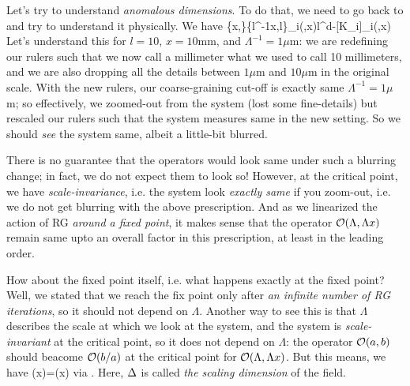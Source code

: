 Let's try to understand \emph{anomalous dimensions}. To do that, we need to go back to  and try to understand it physically. We have
\be 
\{x,\Lambda\}\rightarrow\{l^{-1}x,l\Lambda\}\quad\Rightarrow\quad\cO_i(\Lambda,\Lambda x)\rightarrow l^{d-[K_i]}\cO_i(\Lambda,\Lambda x)
\ee 
Let's understand this for $l=10$, $x=10$mm, and $\Lambda^{-1}=1\mu$m: we are redefining our rulers such that we now call a millimeter what we used to call 10 millimeters, and we are also dropping all the details between $1\mu$m and $10\mu$m in the original scale. With the new rulers, our coarse-graining cut-off is exactly same $\Lambda^{-1}=1\mu$m; so effectively, we zoomed-out from the system (lost some fine-details) but rescaled our rulers such that the system measures same in the new setting. So we should \emph{see} the system same, albeit a little-bit blurred.

There is no guarantee that the operators would look same under such a blurring change; in fact, we do not expect them to look so! However, at the critical point, we have \emph{scale-invariance}, i.e. the system look \emph{exactly same} if you zoom-out, i.e. we do not get blurring with the above prescription. And as we linearized the action of RG \emph{around a fixed point}, it makes sense that the operator $\mathcal{O}(\Lambda,\Lambda x)$ remain same upto an overall factor in this prescription, at least in the leading order.

How about the fixed point itself, i.e. what happens exactly at the fixed point? Well, we stated that we reach the fix point only after \emph{an infinite number of RG iterations}, so it should not depend on $\Lambda$. Another way to see this is that $\Lambda$ describes the scale at which we look at the system, and the system is \emph{scale-invariant} at the critical point, so it does not depend on $\Lambda$: the operator $\mathcal{O}(a,b)$ should beacome $\mathcal{O}(b/a)$ at the critical point for $\mathcal{O}(\Lambda,\Lambda x)$. But this means, we have
\be 
\cO(\lambda x)=\cO(x)
\ee 
via . Here, $\Delta$ is called \emph{the scaling dimension} of the field.

